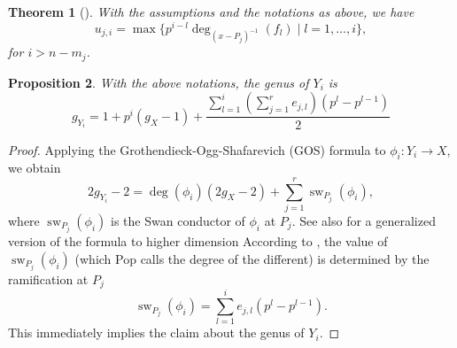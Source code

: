 \documentclass{compositio}
\newcommand{\mat}[1]{\todo[color=green]{MH: #1}}
\newtheorem{theorem}{Theorem}[section]
\newtheorem{proposition}[theorem]{Proposition}
\theoremstyle{remark}
\theoremstyle{remark}
\DeclareMathOperator{\sw}{sw}
\begin{document}
\begin{theorem}[{\cite[Theorem 1]{MR1935414}}]
\label{theoremcaljumpirred}
With the assumptions and the notations as above, we have
\begin{equation}
\label{eqnformulalowerjumpasw}
    u_{j,i}=\max\{ p^{i-l} \deg_{(x-P_j)^{-1}} (f_{l}) \mid l=1, \ldots, i\}, 
\end{equation}
for $i>n-m_j$.
\end{theorem}

\begin{proposition}
With the above notations, the genus of $Y_i$ is
    \begin{equation}
    \label{eqngenera}
        g_{Y_i} = 1+ p^i(g_X-1)+ \frac{\sum_{l=1}^i (\sum_{j=1}^r e_{j,l})(p^l-p^{l-1})}{2}
    \end{equation}
\end{proposition}

\begin{proof}
Applying the Grothendieck-Ogg-Shafarevich (GOS) formula \cite[Exp. X formula 7.2]{MR0491704} to $\phi_i: Y_i \xrightarrow{} X$, we obtain
\begin{equation}
\label{eqnGOS}
2g_{Y_i}-2=\deg(\phi_i) (2g_X-2) + \sum_{j=1}^r \sw_{P_j}(\phi_i),
\end{equation}
where $\sw_{P_j}(\phi_i)$ is the Swan conductor of $\phi_i$ at $P_j$. See also \cite[Theorem 4.2.9]{MR2415398} for a generalized version of the formula to higher dimension 
According to \cite[Fact 2.3]{MR3194816}, the value of $\sw_{P_j}(\phi_i)$ (which Pop calls the degree of the different) is determined by the ramification at $P_j$
\begin{equation}
\label{eqndifferent}
\sw_{P_j}(\phi_i)=\sum_{l=1}^i e_{j,l}(p^l-p^{l-1}).
\end{equation}
This immediately implies the claim about the genus of $Y_i$.
\end{proof}
\end{document}
